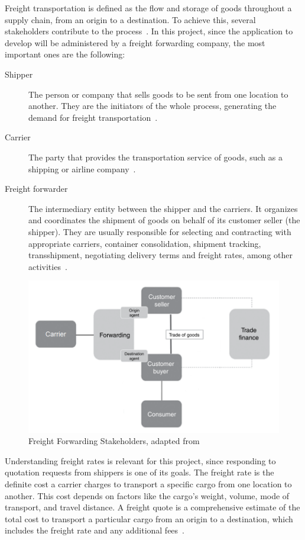 \documentclass[12pt, reqno, oneside]{amsbook}
\theoremstyle{definition}
\theoremstyle{definition}
\numberwithin{section}{chapter}
\numberwithin{table}{chapter}
\numberwithin{figure}{chapter}
\begin{document}
Freight transportation is defined as the flow and storage of goods throughout a supply chain, from an origin to a destination. To achieve this, several stakeholders contribute to the process~\cite{Song2021, Huber2021}. In this project, since the application to develop will be administered by a freight forwarding company, the most important ones are the following:

\begin{description}
  \item [Shipper] The person or company that sells goods to be sent from one location to another. They are the initiators of the whole process, generating the demand for freight transportation~\cite{Song2021}.
  \item [Carrier] The party that provides the transportation service of goods, such as a shipping or airline company~\cite{Song2021}.
  \item [Freight forwarder] The intermediary entity between the shipper and the carriers. It organizes and coordinates the shipment of goods on behalf of its customer seller (the shipper). They are usually responsible for selecting and contracting with appropriate carriers, container consolidation, shipment tracking, transshipment, negotiating delivery terms and freight rates, among other activities~\cite{Song2021, Huang2019}.
\end{description}

\begin{figure}[H]
  \centering
  \includegraphics[width=1\linewidth]{images/FreightForwarding.png}
  \caption{\label{Figure:FreightForwarding}Freight Forwarding Stakeholders, adapted from~\cite{Peffers2007}}
\end{figure}

Understanding freight rates is relevant for this project, since responding to quotation requests from shippers is one of its goals. The freight rate is the definite cost a carrier charges to transport a specific cargo from one location to another. This cost depends on factors like the cargo's weight, volume, mode of transport, and travel distance. A freight quote is a comprehensive estimate of the total cost to transport a particular cargo from an origin to a destination, which includes the freight rate and any additional fees~\cite{Song2021, Mairon_Freight, Wang2021, WebCargo}.
\end{document}
